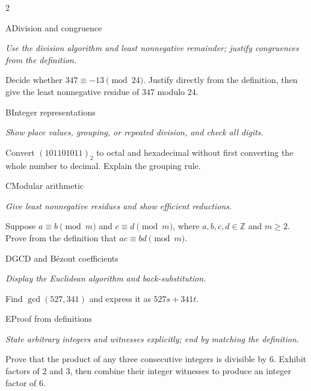 \documentclass[9pt]{extarticle}
\begin{document}
\begin{multicols}{2}
\begin{CoreProblem}{A}{Division and congruence}
{\scriptsize\textit{Use the division algorithm and least nonnegative remainder; justify congruences from the definition.}\par}
Decide whether $347\equiv-13\pmod{24}$. Justify directly from the definition,
then give the least nonnegative residue of $347$ modulo $24$.
\end{CoreProblem}
\begin{CoreProblem}{B}{Integer representations}
{\scriptsize\textit{Show place values, grouping, or repeated division, and check all digits.}\par}
Convert $(101101011)_2$ to octal and hexadecimal without first converting the
whole number to decimal. Explain the grouping rule.
\end{CoreProblem}
\begin{CoreProblem}{C}{Modular arithmetic}
{\scriptsize\textit{Give least nonnegative residues and show efficient reductions.}\par}
Suppose $a\equiv b\pmod m$ and $c\equiv d\pmod m$, where
$a,b,c,d\in\mathbb Z$ and $m\ge2$. Prove from the definition that
$ac\equiv bd\pmod m$.
\end{CoreProblem}
\columnbreak
\begin{CoreProblem}{D}{GCD and B\'ezout coefficients}
{\scriptsize\textit{Display the Euclidean algorithm and back-substitution.}\par}
Find $\gcd(527,341)$ and express it as $527s+341t$.
\end{CoreProblem}
\begin{CoreProblem}{E}{Proof from definitions}
{\scriptsize\textit{State arbitrary integers and witnesses explicitly; end by matching the definition.}\par}
Prove that the product of any three consecutive integers is divisible by $6$.
Exhibit factors of $2$ and $3$, then combine their integer witnesses to
produce an integer factor of $6$.
\end{CoreProblem}
\end{multicols}
\CoreWorkArea
\FormBreak
{}
\end{document}

